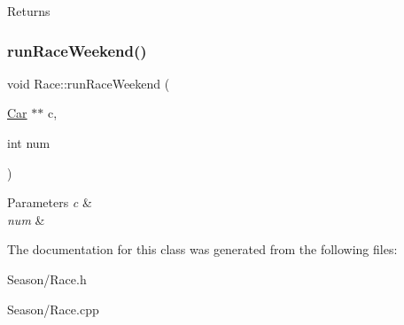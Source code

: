 \begin{DoxyReturn}{Returns}

\end{DoxyReturn}
\mbox{\label{classRace_a3ebb8fd22b1873fa3bb4d9df0bd839a3}} 
\subsubsection{\texorpdfstring{run\+Race\+Weekend()}{runRaceWeekend()}}
{\footnotesize\ttfamily void Race\+::run\+Race\+Weekend (\begin{DoxyParamCaption}\item[{\hyperlink{classCar}{Car} $\ast$$\ast$}]{c,  }\item[{int}]{num }\end{DoxyParamCaption})}


\begin{DoxyParams}{Parameters}
{\em c} & \\
\hline
{\em num} & \\
\hline
\end{DoxyParams}


The documentation for this class was generated from the following files\+:\begin{DoxyCompactItemize}
\item 
Season/Race.\+h\item 
Season/Race.\+cpp\end{DoxyCompactItemize}
